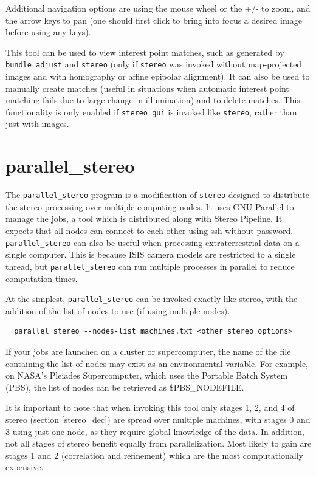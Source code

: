 Additional navigation options are using the mouse wheel or the +/- to
zoom, and the arrow keys to pan (one should first click to bring into
focus a desired image before using any keys).

This tool can be used to view interest point matches, such as generated
by \texttt{bundle\_adjust} and \texttt{stereo} (only if \texttt{stereo}
was invoked without map-projected images and with homography or affine
epipolar alignment). It can also be used to manually create matches
(useful in situations when automatic interest point matching fails due
to large change in illumination) and to delete matches. This functionality
is only enabled if \texttt{stereo\_gui} is invoked like \texttt{stereo},
rather than just with images.


\section{parallel\_stereo}
\label{parallel}

The \texttt{parallel\_stereo} program is a modification of
\texttt{stereo} designed to distribute the stereo processing over
multiple computing nodes. It uses GNU Parallel to manage the jobs, a tool which
is distributed along with Stereo Pipeline. It expects that all nodes
can connect to each other using ssh without password. \texttt{parallel\_stereo}
can also be useful when processing extraterrestrial data on a single computer.
This is because ISIS camera models are restricted to a single thread, but
\texttt{parallel\_stereo} can run multiple processes in parallel to reduce
computation times.

At the simplest, \texttt{parallel\_stereo} can be invoked exactly like stereo,
with the addition of the list of nodes to use (if using multiple nodes).

\begin{verbatim}
  parallel_stereo --nodes-list machines.txt <other stereo options>
\end{verbatim}

If your jobs are launched on a cluster or supercomputer, the name of the
file containing the list of nodes may exist as an environmental
variable. For example, on NASA's Pleiades Supercomputer, which uses the
Portable Batch System (PBS), the list of nodes can be retrieved as
\$PBS\_NODEFILE.

It is important to note that when invoking this tool only stages 1, 2,
and 4 of stereo (section \ref{stereo_dec}) are spread over multiple
machines, with stages 0 and 3 using just one node, as they require
global knowledge of the data. In addition, not all stages of stereo
benefit equally from parallelization. Most likely to gain are stages 1
and 2 (correlation and refinement) which are the most computationally
expensive.

